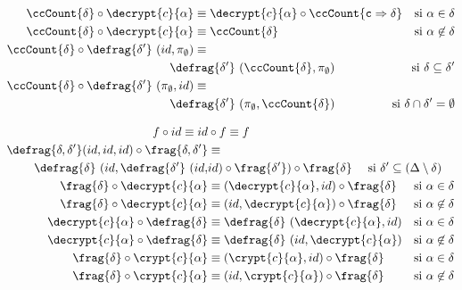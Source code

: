 \begin{align}
	\ccCount{\delta} \circ \decrypt{c}{\alpha}
	&\equiv \decrypt{c}{\alpha} \circ \ccCount{\typeT{c} \Rightarrow \delta}
	&\text{si $\alpha \in \delta$}
	\label{eq:law-cnt-enc1}\\
	\ccCount{\delta} \circ \decrypt{c}{\alpha}
	&\equiv \ccCount{\delta}
	&\text{si $\alpha \not\in \delta$}
	\label{eq:law-cnt-enc2}\\
	\ccCount{\delta} \circ \defrag{\delta'}\ (id, \ccPrj{\emptyset})
	&\equiv \nonumber\\
	&\kern -2em\defrag{\delta'}\ (\ccCount{\delta}, \ccPrj{\emptyset})
	&\kern -5em\text{si $\delta \subseteq \delta'$}
	\label{eq:law-cnt-frag1}\\
	\ccCount{\delta} \circ \defrag{\delta'}\ (\ccPrj{\emptyset}, id)
	&\equiv\nonumber\\
	&\kern -2em\defrag{\delta'}\ (\ccPrj{\emptyset}, \ccCount{\delta})
	&\kern -5em\text{si $\delta \cap \delta' = \emptyset$}
	\label{eq:law-cnt-frag2}
\end{align}

\begin{align}
	f \circ id \equiv id &\circ f \equiv f
	\label{eq:law-cmp-id}\\
	\defrag{\delta, \delta'} (id, id, id) \circ \frag{\delta, \delta'}
	&\equiv\nonumber\span\span\\
	\defrag{\delta}\ (id, \defrag{\delta'}\ (id, &id)
	\circ \frag{\delta'}) \circ \frag{\delta}
	\quad\,\,\text{si $\delta' \subseteq (\Delta \setminus \delta)$}
	\span\span
	\label{eq:law-cmp-frag}\\
	\frag{\delta} \circ \decrypt{c}{\alpha}
	&\equiv (\decrypt{c}{\alpha}, id) \circ \frag{\delta}
	&\text{si $\alpha \in \delta$}
	\label{eq:law-cmp-fgcr1}\\
	\frag{\delta} \circ \decrypt{c}{\alpha}
	&\equiv (id, \decrypt{c}{\alpha}) \circ \frag{\delta}
	&\text{si $\alpha \not\in \delta$}
	\label{eq:law-cmp-fgcr2}\\
	\decrypt{c}{\alpha} \circ \defrag{\delta}
	&\equiv \defrag{\delta}\ (\decrypt{c}{\alpha}, id)
	&\text{si $\alpha \in \delta$}
	\label{eq:law-cmp-crfg1}\\
	\decrypt{c}{\alpha} \circ \defrag{\delta}
	&\equiv \defrag{\delta}\ (id, \decrypt{c}{\alpha})
	&\text{si $\alpha \not\in \delta$}
	\label{eq:law-cmp-crfg2}\\
	\frag{\delta} \circ \crypt{c}{\alpha}
	&\equiv (\crypt{c}{\alpha}, id) \circ \frag{\delta}
	&\text{si $\alpha \in \delta$}
	\label{eq:law-cmp-fgcr3}\\
	\frag{\delta} \circ \crypt{c}{\alpha}
	&\equiv (id, \crypt{c}{\alpha}) \circ \frag{\delta}
	&\text{si $\alpha \not\in \delta$}
	\label{eq:law-cmp-fgcr4}
\end{align}
